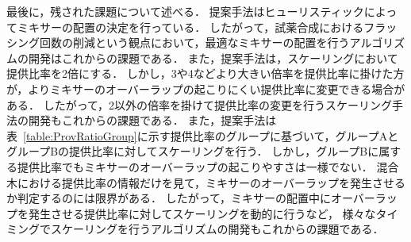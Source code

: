 最後に，残された課題について述べる．
提案手法はヒューリスティックによってミキサーの配置の決定を行っている．
したがって，試薬合成におけるフラッシング回数の削減という観点において，最適なミキサーの配置を行うアルゴリズムの開発はこれからの課題である．
また，提案手法は，スケーリングにおいて提供比率を2倍にする．
しかし，3や4などより大きい倍率を提供比率に掛けた方が，よりミキサーのオーバーラップの起こりにくい提供比率に変更できる場合がある．
したがって，2以外の倍率を掛けて提供比率の変更を行うスケーリング手法の開発もこれからの課題である．
また，提案手法は表~\ref{table:ProvRatioGroup}に示す提供比率のグループに基づいて，グループAとグループBの提供比率に対してスケーリングを行う．
しかし，グループBに属する提供比率でもミキサーのオーバーラップの起こりやすさは一様でない．
混合木における提供比率の情報だけを見て，ミキサーのオーバーラップを発生させるか判定するのには限界がある．
したがって，ミキサーの配置中にオーバーラップを発生させる提供比率に対してスケーリングを動的に行うなど，
様々なタイミングでスケーリングを行うアルゴリズムの開発もこれからの課題である．
%
